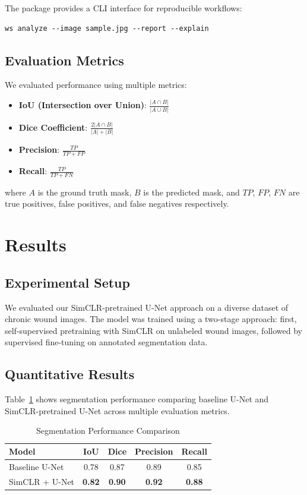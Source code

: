 \documentclass[conference]{IEEEtran}
\begin{document}
The package provides a CLI interface for reproducible workflows:
\begin{verbatim}
ws analyze --image sample.jpg --report --explain
\end{verbatim}

\subsection{Evaluation Metrics}
We evaluated performance using multiple metrics:
\begin{itemize}
\item \textbf{IoU (Intersection over Union)}: $\frac{|A \cap B|}{|A \cup B|}$
\item \textbf{Dice Coefficient}: $\frac{2|A \cap B|}{|A| + |B|}$
\item \textbf{Precision}: $\frac{TP}{TP + FP}$
\item \textbf{Recall}: $\frac{TP}{TP + FN}$
\end{itemize}

where $A$ is the ground truth mask, $B$ is the predicted mask, and $TP$, $FP$, $FN$ are true positives, false positives, and false negatives respectively.

\section{Results}
\subsection{Experimental Setup}
We evaluated our SimCLR-pretrained U-Net approach on a diverse dataset of chronic wound images. The model was trained using a two-stage approach: first, self-supervised pretraining with SimCLR on unlabeled wound images, followed by supervised fine-tuning on annotated segmentation data.

\subsection{Quantitative Results}
Table~\ref{tab:results} shows segmentation performance comparing baseline U-Net and SimCLR-pretrained U-Net across multiple evaluation metrics.

\begin{table}[h]
\centering
\caption{Segmentation Performance Comparison}
\label{tab:results}
\begin{tabular}{|l|c|c|c|c|}
\hline
Model & IoU & Dice & Precision & Recall \\
\hline
Baseline U-Net & 0.78 & 0.87 & 0.89 & 0.85 \\
SimCLR + U-Net & \textbf{0.82} & \textbf{0.90} & \textbf{0.92} & \textbf{0.88} \\
\hline
\end{tabular}
\end{table}
\end{document}
